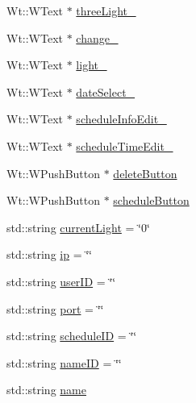 \begin{DoxyCompactItemize}
\item 
Wt\+::\+W\+Text $\ast$ \hyperlink{classSingleSchedulerControlWidget_a132611ac95921a1f32888a15b09a16a5}{three\+Light\+\_\+}
\item 
Wt\+::\+W\+Text $\ast$ \hyperlink{classSingleSchedulerControlWidget_a55fa60e9c72898895dcb2bd3740f544b}{change\+\_\+}
\item 
Wt\+::\+W\+Text $\ast$ \hyperlink{classSingleSchedulerControlWidget_a91f77910545268fdd89df0f9903dbb1a}{light\+\_\+}
\item 
Wt\+::\+W\+Text $\ast$ \hyperlink{classSingleSchedulerControlWidget_a42e8c83f6d9c385f217d1bbd1e6e5038}{date\+Select\+\_\+}
\item 
Wt\+::\+W\+Text $\ast$ \hyperlink{classSingleSchedulerControlWidget_a52857293e1ffa711d8e32c5905fca173}{schedule\+Info\+Edit\+\_\+}
\item 
Wt\+::\+W\+Text $\ast$ \hyperlink{classSingleSchedulerControlWidget_a7ec275b7a9811ca553e873fc12402c56}{schedule\+Time\+Edit\+\_\+}
\item 
Wt\+::\+W\+Push\+Button $\ast$ \hyperlink{classSingleSchedulerControlWidget_ad90ddf9ce495e587d6457cda5422858c}{delete\+Button}
\item 
Wt\+::\+W\+Push\+Button $\ast$ \hyperlink{classSingleSchedulerControlWidget_ae8dd8c0b3020fcff9d237f5c16ab5396}{schedule\+Button}
\item 
std\+::string \hyperlink{classSingleSchedulerControlWidget_af4170d8a55962a3d2048f344516befff}{current\+Light} = \char`\"{}0\char`\"{}
\item 
std\+::string \hyperlink{classSingleSchedulerControlWidget_a218706e43a5777961386c8bdee383192}{ip} = \char`\"{}\char`\"{}
\item 
std\+::string \hyperlink{classSingleSchedulerControlWidget_ae067a0f04e22f78c73a5a372661ecc68}{user\+ID} = \char`\"{}\char`\"{}
\item 
std\+::string \hyperlink{classSingleSchedulerControlWidget_aa5647267c15e301af0a354f12c71d2af}{port} = \char`\"{}\char`\"{}
\item 
std\+::string \hyperlink{classSingleSchedulerControlWidget_a715d00f6515686a6df0a7e5a4b0ececd}{schedule\+ID} = \char`\"{}\char`\"{}
\item 
std\+::string \hyperlink{classSingleSchedulerControlWidget_ae803e75c73103097b72fc1e192a2c737}{name\+ID} = \char`\"{}\char`\"{}
\item 
std\+::string \hyperlink{classSingleSchedulerControlWidget_a5d3c98481e521dbcbde9d78ef0422c70}{name}
\item 

\end{DoxyCompactItemize}
